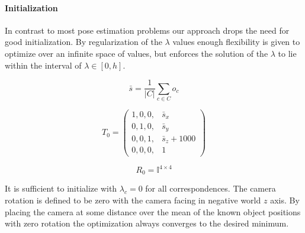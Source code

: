 \paragraph{Initialization}
In contrast to most pose estimation problems our approach drops the need for good initialization. 
By regularization of the $\lambda$ values enough flexibility is given to optimize over an infinite space of values, 
but enforces the solution of the $\lambda$ to lie within the interval of $\lambda \in [0, h]$.

\begin{equation}
  \bar{s} = \frac{1}{\left\lvert C \right\rvert } \sum_{c \in C} o_c 
\end{equation}

\begin{equation}
  T_0 = \begin{pmatrix}
    1, 0, 0,& \bar{s}_x \\   
    0, 1, 0,& \bar{s}_y \\   
    0, 0, 1,& \bar{s}_z + 1000 \\   
    0, 0, 0,& 1   
  \end{pmatrix}
\end{equation}

\begin{equation}
  R_0 = \mathbb{I} ^ {4 \times 4}
\end{equation}

It is sufficient to initialize with $\lambda_c = 0$ for all correspondences.
The camera rotation is defined to be zero with the camera facing in negative world $z$ axis.
By placing the camera at some distance over the mean of the known object positions with zero rotation the optimization always converges to the desired minimum.

